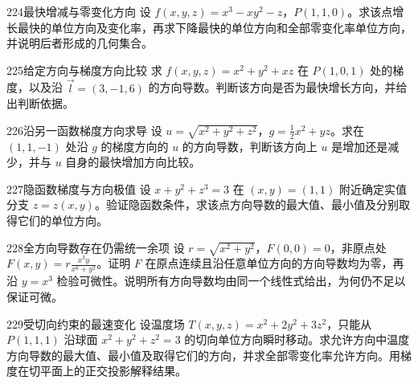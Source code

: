 \begin{exercise}{224}{最快增减与零变化方向}
设 $f(x,y,z)=x^3-xy^2-z$，$P(1,1,0)$。求该点增长最快的单位方向及变化率，再求下降最快的单位方向和全部零变化率单位方向，并说明后者形成的几何集合。
\end{exercise}
\begin{exercise}{225}{给定方向与梯度方向比较}
求 $f(x,y,z)=x^2+y^2+xz$ 在 $P(1,0,1)$ 处的梯度，以及沿 $\vec l=(3,-1,6)$ 的方向导数。判断该方向是否为最快增长方向，并给出判断依据。
\end{exercise}
\begin{exercise}{226}{沿另一函数梯度方向求导}
设 $u=\sqrt{x^2+y^2+z^2}$，$g=\frac12x^2+yz$。求在 $(1,1,-1)$ 处沿 $g$ 的梯度方向的 $u$ 的方向导数，判断该方向上 $u$ 是增加还是减少，并与 $u$ 自身的最快增加方向比较。
\end{exercise}
\begin{exercise}{227}{隐函数梯度与方向极值}
设 $x+y^2+z^3=3$ 在 $(x,y)=(1,1)$ 附近确定实值分支 $z=z(x,y)$。验证隐函数条件，求该点方向导数的最大值、最小值及分别取得它们的单位方向。
\end{exercise}
\begin{exercise}{228}{全方向导数存在仍需统一余项}
设 $r=\sqrt{x^2+y^2}$，$F(0,0)=0$，非原点处 $F(x,y)=r\frac{x^3y}{x^6+y^2}$。证明 $F$ 在原点连续且沿任意单位方向的方向导数均为零，再沿 $y=x^3$ 检验可微性。说明所有方向导数均由同一个线性式给出，为何仍不足以保证可微。
\end{exercise}
\begin{exercise}{229}{受切向约束的最速变化}
设温度场 $T(x,y,z)=x^2+2y^2+3z^2$，只能从 $P(1,1,1)$ 沿球面 $x^2+y^2+z^2=3$ 的切向单位方向瞬时移动。求允许方向中温度方向导数的最大值、最小值及取得它们的方向，并求全部零变化率允许方向。用梯度在切平面上的正交投影解释结果。
\end{exercise}
